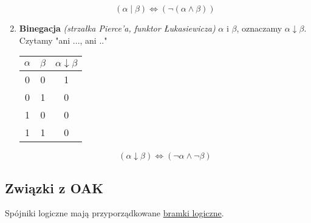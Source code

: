 \documentclass[a5paper,8pt]{article}
\begin{document}
\begin{enumerate}
                \begin{equation*}
                    (\alpha \mid \beta) \Leftrightarrow (\neg (\alpha \wedge \beta))
                \end{equation*}

                \pagebreak
                \item \textbf{Binegacja} \textit{(strzałka Pierce'a, funktor Łukasiewicza)} $\alpha$ i $\beta$, oznaczamy $\alpha \downarrow \beta$.\\
                Czytamy "ani ..., ani .."\\

                \begin{center}
                    \begin{tabular}{|c|c|c|}
                      \hline 
                      $\alpha$ & $\beta$ & $\alpha \downarrow \beta$\\
                      \hline
                      0 & 0 & 1\\
                      \hline
                      0 & 1 & 0\\
                      \hline
                      1 & 0 & 0\\
                      \hline
                      1 & 1 & 0\\
                      \hline
                    \end{tabular}
                \end{center}

                \begin{equation*}
                    (\alpha \downarrow \beta) \Leftrightarrow (\neg \alpha \wedge \neg \beta)
                \end{equation*}

            \end{enumerate}
            
        \subsection{Związki z OAK} %
        \label{sub:związki_z_oak}
            Spójniki logiczne mają przyporządkowane \underline{bramki logiczne}.
\end{document}
